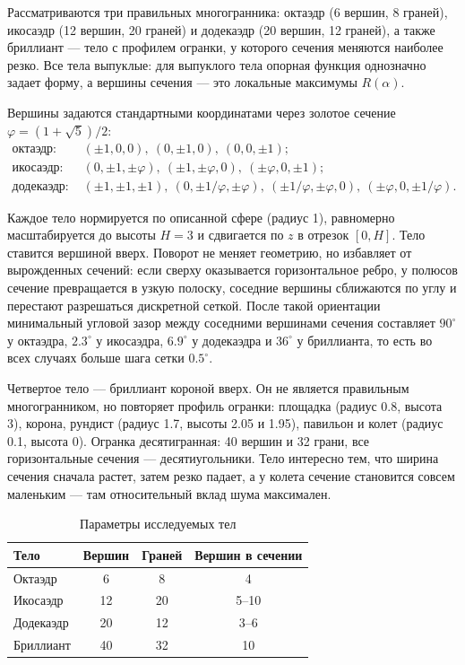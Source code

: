 \documentclass[12pt, a4paper]{article}
\begin{document}
Рассматриваются три правильных многогранника: октаэдр (6 вершин, 8 граней), икосаэдр (12 вершин, 20 граней) и додекаэдр (20 вершин, 12 граней), а также бриллиант --- тело с профилем огранки, у которого сечения меняются наиболее резко. Все тела выпуклые: для выпуклого тела опорная функция однозначно задает форму, а вершины сечения --- это локальные максимумы $R(\alpha)$.

Вершины задаются стандартными координатами через золотое сечение $\varphi=(1+\sqrt{5})/2$:
\begin{align*}
\text{октаэдр: } & (\pm 1,0,0),\ (0,\pm 1,0),\ (0,0,\pm 1); \\
\text{икосаэдр: } & (0,\pm 1,\pm\varphi),\ (\pm 1,\pm\varphi,0),\ (\pm\varphi,0,\pm 1); \\
\text{додекаэдр: } & (\pm 1,\pm 1,\pm 1),\ (0,\pm 1/\varphi,\pm\varphi),\
(\pm 1/\varphi,\pm\varphi,0),\ (\pm\varphi,0,\pm 1/\varphi).
\end{align*}

Каждое тело нормируется по описанной сфере (радиус 1), равномерно масштабируется до высоты $H=3$ и сдвигается по $z$ в отрезок $[0,H]$. Тело ставится вершиной вверх. Поворот не меняет геометрию, но избавляет от вырожденных сечений: если сверху оказывается горизонтальное ребро, у полюсов сечение превращается в узкую полоску, соседние вершины сближаются по углу и перестают разрешаться дискретной сеткой. После такой ориентации минимальный угловой зазор между соседними вершинами сечения составляет $90^\circ$ у октаэдра, $2.3^\circ$ у икосаэдра, $6.9^\circ$ у додекаэдра и $36^\circ$ у бриллианта, то есть во всех случаях больше шага сетки $0.5^\circ$.

Четвертое тело --- бриллиант короной вверх. Он не является правильным многогранником, но повторяет профиль огранки: площадка (радиус 0.8, высота 3), корона, рундист (радиус 1.7, высоты 2.05 и 1.95), павильон и колет (радиус 0.1, высота 0). Огранка десятигранная: 40 вершин и 32 грани, все горизонтальные сечения --- десятиугольники. Тело интересно тем, что ширина сечения сначала растет, затем резко падает, а у колета сечение становится совсем маленьким --- там относительный вклад шума максимален.

\begin{table}[H]
\centering
\caption{Параметры исследуемых тел}
\label{tab:3dbodies}
\begin{tabular}{|l|c|c|c|}
\hline
Тело & Вершин & Граней & Вершин в сечении \\
\hline
Октаэдр & 6 & 8 & 4 \\
Икосаэдр & 12 & 20 & 5--10 \\
Додекаэдр & 20 & 12 & 3--6 \\
Бриллиант & 40 & 32 & 10 \\
\hline
\end{tabular}
\end{table}
\end{document}
